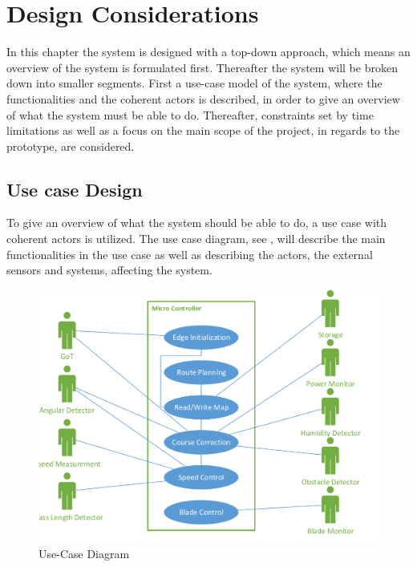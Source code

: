 \chapter{Design Considerations}
\vspace{-5 mm}
In this chapter the system is designed with a top-down approach, which means an overview of the system is formulated first. Thereafter the system will be broken down into smaller segments. First a use-case model of the system, where the functionalities and the coherent actors is described, in order to give an overview of what the system must be able to do. Thereafter, constraints set by time limitations as well as a focus on the main scope of the project, in regards to the prototype, are considered.
\vspace{-4 mm}
\section{Use case Design}
To give an overview of what the system should be able to do, a use case with coherent actors is utilized. The use case diagram, see , will describe the main functionalities in the use case as well as describing the actors, the external sensors and systems, affecting the system.


\vspace{-3 mm}
 \begin{figure}[H]
	\centering
	\includegraphics[scale=0.8]{figures/P5UseCase.pdf}
	\caption{Use-Case Diagram}
	\label{fig:usecase}
\end{figure}

